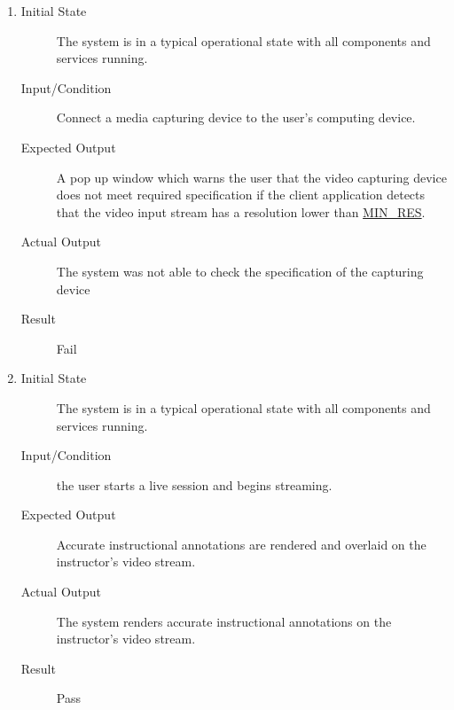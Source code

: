 \documentclass[12pt, titlepage]{article}
\begin{document}
\begin{enumerate}[NFR-T1]
  \item \label{NFRT11}
    \begin{description}
    \item[Initial State] The system is in a typical operational state with all
      components and services running.
    \item[Input/Condition] Connect a media capturing device to the user’s computing
      device.
    \item[Expected Output] A pop up window which warns the user that the video
      capturing device does not meet required specification if the client
      application detects that the video input stream has a resolution lower
      than \hyperref[const:res]{MIN\_RES}.
    \item[Actual Output] The system was not able to check the specification of the
      capturing device
    \item[Result] Fail
    \end{description}
  \item \label{NFRT12}
    \begin{description}
    \item[Initial State] The system is in a typical operational state with all
      components and services running.
    \item[Input/Condition] the user starts a live session and begins streaming.
    \item[Expected Output] Accurate instructional annotations are rendered and
      overlaid on the instructor’s video stream.
    \item[Actual Output] The system renders accurate instructional annotations on
      the instructor’s video stream.
    \item[Result] Pass
    \end{description}

\end{enumerate}
\end{document}

